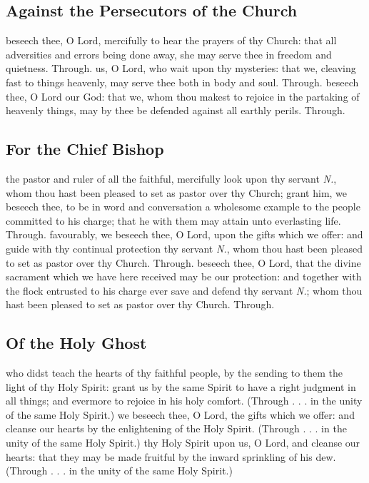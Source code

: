\begin{multicols}{2}
   \subsection{Against the Persecutors of the Church}\label{SPAgainst}
   \collect
    beseech thee, O Lord, mercifully to hear the prayers of thy Church: that all adversities and errors being done away, she may serve thee in freedom and quietness. Through.
   \secret
    us, O Lord, who wait upon thy mysteries: that we, cleaving fast to things heavenly, may serve thee both in body and soul. Through.
   \postcommunion
    beseech thee, O Lord our God: that we, whom thou makest to rejoice in the partaking of heavenly things, may by thee be defended against all earthly perils. Through.
   
   \newcolumn

   \subsection{For the Chief Bishop}\label{SPChiefBishop}
   \collect
    the pastor and ruler of all the faithful, mercifully look upon thy servant \emph{N.}, whom thou hast been pleased to set as pastor over thy Church; grant him, we beseech thee, to be in word and conversation a wholesome example to the people committed to his charge; that he with them may attain unto everlasting life. Through.
   \secret
    favourably, we beseech thee, O Lord, upon the gifts which we offer: and guide with thy continual protection thy servant \textit{N.}, whom thou hast been pleased to set as pastor over thy Church. Through.
   \postcommunion
    beseech thee, O Lord, that the divine sacrament which we have here received may be our protection: and together with the flock entrusted to his charge ever save and defend thy servant \textit{N.}; whom thou hast been pleased to set as pastor over thy Church. Through.
   
   \newcolumn

   \subsection{Of the Holy Ghost}\label{SPHolyGhost}
   \collect
    who didst teach the hearts of thy faithful people, by the sending to them the light of thy Holy Spirit: grant us by the same Spirit to have a right judgment in all things; and evermore to rejoice in his holy comfort. (Through . . . in the unity of the same Holy Spirit.)
   \secret
    we beseech thee, O Lord, the gifts which we offer: and cleanse our hearts by the enlightening of the Holy Spirit. (Through . . . in the unity of the same Holy Spirit.)
   \postcommunion
    thy Holy Spirit upon us, O Lord, and cleanse our hearts: that they may be made fruitful by the inward sprinkling of his dew. (Through . . . in the unity of the same Holy Spirit.)


\end{multicols}
